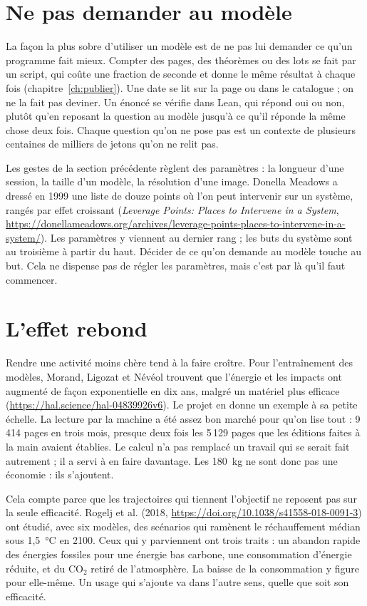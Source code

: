 \section{Ne pas demander au modèle}

La façon la plus sobre d'utiliser un modèle est de ne pas lui demander ce qu'un programme
fait mieux. Compter des pages, des théorèmes ou des lots se fait par un script, qui coûte
une fraction de seconde et donne le même résultat à chaque fois
(chapitre~\ref{ch:publier}). Une date se lit sur la page ou dans le catalogue ; on ne la
fait pas deviner. Un énoncé se vérifie dans Lean, qui répond oui ou non, plutôt qu'en
reposant la question au modèle jusqu'à ce qu'il réponde la même chose deux fois. Chaque
question qu'on ne pose pas est un contexte de plusieurs centaines de milliers de jetons
qu'on ne relit pas.

Les gestes de la section précédente règlent des paramètres : la longueur d'une session, la
taille d'un modèle, la résolution d'une image. Donella Meadows a dressé en 1999 une liste
de douze points où l'on peut intervenir sur un système, rangés par effet croissant
(\emph{Leverage Points: Places to Intervene in a System},
\url{https://donellameadows.org/archives/leverage-points-places-to-intervene-in-a-system/}).
Les paramètres y viennent au dernier rang ; les buts du système sont au troisième à partir
du haut. Décider de ce qu'on demande au modèle touche au but. Cela ne dispense pas de
régler les paramètres, mais c'est par là qu'il faut commencer.

\section{L'effet rebond}

Rendre une activité moins chère tend à la faire croître. Pour l'entraînement des modèles,
Morand, Ligozat et Névéol trouvent que l'énergie et les impacts ont augmenté de façon
exponentielle en dix ans, malgré un matériel plus efficace
(\url{https://hal.science/hal-04839926v6}). Le projet en donne un exemple à sa petite
échelle. La lecture par la machine a été assez bon marché pour qu'on lise tout : 9\,414
pages en trois mois, presque deux fois les 5\,129 pages que les éditions faites à la main
avaient établies. Le calcul n'a pas remplacé un travail qui se serait fait autrement ; il a
servi à en faire davantage. Les 180~kg ne sont donc pas une économie : ils s'ajoutent.

Cela compte parce que les trajectoires qui tiennent l'objectif ne reposent pas sur la
seule efficacité. Rogelj et al. (2018, \url{https://doi.org/10.1038/s41558-018-0091-3})
ont étudié, avec six modèles, des scénarios qui ramènent le réchauffement médian sous
1,5~°C en 2100. Ceux qui y parviennent ont trois traits : un abandon rapide des énergies
fossiles pour une énergie bas carbone, une consommation d'énergie réduite, et du CO$_2$
retiré de l'atmosphère. La baisse de la consommation y figure pour elle-même. Un usage qui
s'ajoute va dans l'autre sens, quelle que soit son efficacité.

